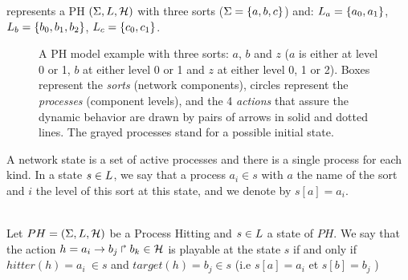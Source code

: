 \begin{example*}
 represents a PH $(\Sigma,L,\mathcal{H})$ with three sorts
($\Sigma = \{a, b, c\}$) and:
$L_a = \{a_0, a_1\}$,
$L_b = \{b_0, b_1, b_2\}$,
$L_c = \{c_0, c_1\}$.
\begin{figure}[ht]
\centering
{}
\caption{\label{fig:ph} 
A PH model example with three sorts: $a$, $b$ and $z$ ($a$ is either at level 0 or 1, $b$ at either level 0 or 1 and $z$ at either level 0, 1 or 2). Boxes represent the \emph{sorts} (network components), circles represent the \emph{processes} (component levels), and the 4 \emph{actions} that assure the dynamic behavior are drawn by pairs of arrows in solid and dotted lines. The grayed processes stand for a possible initial state.
}
\end{figure}
\end{example*}
A network state is a set of active processes and there is a single process for each kind. In a state $ s \in L$, we say that a process $ a_i \in s$ with $ a $ the name of the sort and $ i $ the level of this sort at this state, and we denote by $s[a]= a_i$.

\begin{definition} 
\label{def:playableAction}\\
Let $PH = (\Sigma,L,\mathcal{H})$ be a Process Hitting and $s \in L$ a state of $PH$. We say that the action $h = a_i\rightarrow b_j\Rsh b_k \in \mathcal{H}$ is playable at the state $s$ if and only if $hitter(h)=a_i ~ \in s$ and $target(h)=b_j \in s$ (i.e $s[a]=a_i$ et $s[b]=b_j$ ) \\

\end{definition}

